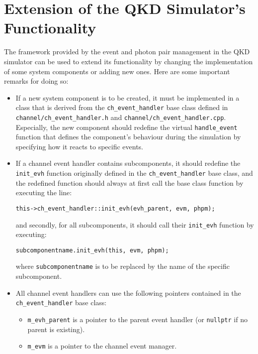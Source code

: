 \section{Extension of the QKD Simulator's Functionality}

The framework provided by the event and photon pair management in the QKD simulator can be used to extend its functionality by changing the implementation of some system components or adding new ones. Here are some important remarks for doing so:

\begin{itemize}

\item If a new system component is to be created, it must be implemented in a class that is derived from the \texttt{ch\_event\_handler} base class defined in \texttt{channel/ch\_event\_handler.h} and \texttt{channel/ch\_event\_handler.cpp}. Especially, the new component should redefine the virtual \texttt{handle\_event} function that defines the component's behaviour during the simulation by specifying how it reacts to specific events.

\item If a channel event handler contains subcomponents, it should redefine the \texttt{init\_evh} function originally defined in the \texttt{ch\_event\_handler} base class, and the redefined function should always at first call the base class function by executing the line:
\begin{lstlisting}
this->ch_event_handler::init_evh(evh_parent, evm, phpm);
\end{lstlisting}
and secondly, for all subcomponents, it should call their \texttt{init\_evh} function by executing:
\begin{lstlisting}
subcomponentname.init_evh(this, evm, phpm);
\end{lstlisting}
where \texttt{subcomponentname} is to be replaced by the name of the specific subcomponent.

\item All channel event handlers can use the following pointers contained in the \texttt{ch\_event\_handler} base class:

\begin{itemize}

\item \texttt{m\_evh\_parent} is a pointer to the parent event handler (or \texttt{nullptr} if no parent is existing).

\item \texttt{m\_evm} is a pointer to the channel event manager.


\end{itemize}
\end{itemize}
